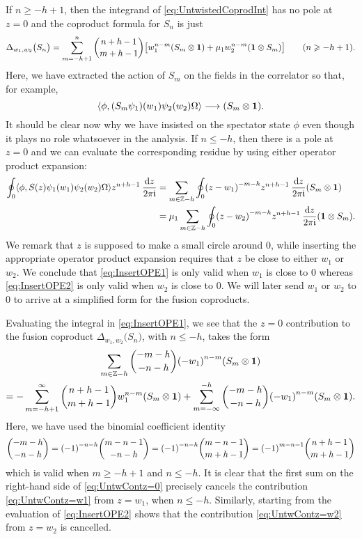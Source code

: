 \documentclass[a4paper,reqno,12pt]{report}
\theoremstyle{definition}
\numberwithin{equation}{section}
\let\originalleft\left     %
\let\originalright\right
\renewcommand{\left}{\mathopen{}\mathclose\bgroup\originalleft}
\renewcommand{\right}{\aftergroup\egroup\originalright}
\newcommand{\func}[2]{#1 \left( #2 \right)} %
\newcommand{\brac}[1]{\left( #1 \right)}
\newcommand{\sqbrac}[1]{\left[ #1 \right]}
\newcommand{\ZZ}{\mathbb{Z}}
\newcommand{\dd}{\mathrm{d}}   %
\newcommand{\ii}{\mathfrak{i}} %
\newcommand{\wun}{\mathbf{1}}  %
\newcommand{\inner}[2]{\left\langle #1 , #2 \right\rangle} %
\newcommand{\lra}{\longrightarrow}
\newcommand{\coproductsymb}{\Delta}                                                %
\newcommand{\parcoproduct}[2]{\coproductsymb_{#1} \bigl( #2 \bigr)}                %
\newcommand{\ope}{operator product expansion}
\newcommand{\rhs}{right-hand side}
\renewcommand{\ge}{\geqslant}
\renewcommand{\le}{\leqslant}
\theoremstyle{plain}
\begin{document}
If $n \ge -h+1$, then the integrand of \eqref{eq:UntwistedCoprodInt} has no pole at $z=0$ and the coproduct formula for $S_n$ is just
\begin{equation}
\parcoproduct{w_1,w_2}{S_n} = \sum_{m=-h+1}^n \binom{n+h-1}{m+h-1} \sqbrac{w_1^{n-m} \brac{S_m \otimes \wun} + \mu_1 w_2^{n-m} \brac{\wun \otimes S_m}} \qquad \text{(\(n \ge -h+1\)).}
\end{equation}
Here, we have extracted the action of $S_m$ on the fields in the correlator so that, for example,
\begin{equation}
\inner{\phi}{\func{(S_m \psi_1)}{w_1} \func{\psi_2}{w_2} \Omega} \lra \brac{S_m \otimes \wun}.
\end{equation}
It should be clear now why we have insisted on the spectator state $\phi$ even though it plays no role whatsoever in the analysis.  If $n \le -h$, then there is a pole at $z=0$ and we can evaluate the corresponding residue by using either \ope{}:
\begin{subequations}
\begin{align}
\oint_0 \inner{\phi}{\func{S}{z} \func{\psi_1}{w_1} \func{\psi_2}{w_2} \Omega} z^{n+h-1} \: \frac{\dd z}{2 \pi \ii} &= \sum_{m \in \ZZ - h} \oint_0 \brac{z-w_1}^{-m-h} z^{n+h-1} \: \frac{\dd z}{2 \pi \ii} \brac{S_m \otimes \wun} \label{eq:InsertOPE1} \\
&= \mu_1 \sum_{m \in \ZZ - h} \oint_0 \brac{z-w_2}^{-m-h} z^{n+h-1} \: \frac{\dd z}{2 \pi \ii} \brac{\wun \otimes S_m}. \label{eq:InsertOPE2}
\end{align}
\end{subequations}
We remark that $z$ is supposed to make a small circle around $0$, while inserting the appropriate \ope{} requires that $z$ be close to either $w_1$ or $w_2$.  We conclude that \eqref{eq:InsertOPE1} is only valid when $w_1$ is close to $0$ whereas \eqref{eq:InsertOPE2} is only valid when $w_2$ is close to $0$.  We will later send $w_1$ or $w_2$ to $0$ to arrive at a simplified form for the fusion coproducts.

Evaluating the integral in \eqref{eq:InsertOPE1}, we see that the $z=0$ contribution to the fusion coproduct $\parcoproduct{w_1,w_2}{S_n}$, with $n \le -h$, takes the form
\begin{multline} \label{eq:UntwContz=0}
\sum_{m \in \ZZ - h} \binom{-m-h}{-n-h} \brac{-w_1}^{n-m} \brac{S_m \otimes \wun} \\
= -\sum_{m=-h+1}^{\infty} \binom{n+h-1}{m+h-1} w_1^{n-m} \brac{S_m \otimes \wun} + \sum_{m=-\infty}^{-h} \binom{-m-h}{-n-h} \brac{-w_1}^{n-m} \brac{S_m \otimes \wun}.
\end{multline}
Here, we have used the binomial coefficient identity
\begin{equation}
\binom{-m-h}{-n-h} = \brac{-1}^{-n-h} \binom{m-n-1}{-n-h} = \brac{-1}^{-n-h} \binom{m-n-1}{m+h-1} = \brac{-1}^{m-n-1} \binom{n+h-1}{m+h-1}
\end{equation}
which is valid when $m \ge -h+1$ and $n \le -h$.  It is clear that the first sum on the \rhs{} of \eqref{eq:UntwContz=0} precisely cancels the contribution \eqref{eq:UntwContz=w1} from $z=w_1$, when $n \le -h$.  Similarly, starting from the evaluation of \eqref{eq:InsertOPE2} shows that the contribution \eqref{eq:UntwContz=w2} from $z=w_2$ is cancelled.
\end{document}
